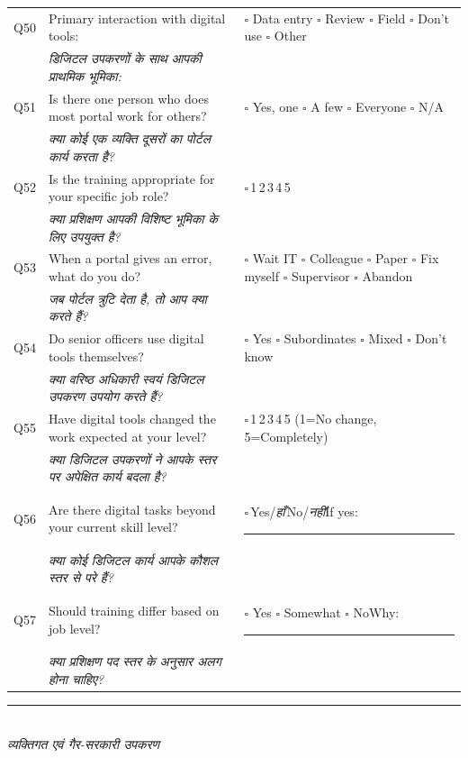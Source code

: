 \documentclass[10pt,a4paper]{article}
\newcommand{\likert}{{\Large$\square$}\,1\quad{\Large$\square$}\,2\quad{\Large$\square$}\,3\quad{\Large$\square$}\,4\quad{\Large$\square$}\,5}
\newcommand{\ymark}{{\Large$\square$}\,Yes/{\hindifont\itshape हाँ}\quad{\Large$\square$}\,No/{\hindifont\itshape नहीं}}
\begin{document}
\noindent\begin{tabularx}{\textwidth}{@{}L{0.8cm} X L{5.2cm}@{}}
Q50 & Primary interaction with digital tools: & {\Large$\square$} Data entry {\Large$\square$} Review {\Large$\square$} Field {\Large$\square$} Don't use {\Large$\square$} Other \\
 & {\hindifont\small\itshape\color{black!70} डिजिटल उपकरणों के साथ आपकी प्राथमिक भूमिका:} & \\[3pt]
Q51 & Is there one person who does most portal work for others? & {\Large$\square$} Yes, one {\Large$\square$} A few {\Large$\square$} Everyone {\Large$\square$} N/A \\
 & {\hindifont\small\itshape\color{black!70} क्या कोई एक व्यक्ति दूसरों का पोर्टल कार्य करता है?} & \\[3pt]
Q52 & Is the training appropriate for your specific job role? & \likert \\
 & {\hindifont\small\itshape\color{black!70} क्या प्रशिक्षण आपकी विशिष्ट भूमिका के लिए उपयुक्त है?} & \\[3pt]
Q53 & When a portal gives an error, what do you do? & {\Large$\square$} Wait IT {\Large$\square$} Colleague {\Large$\square$} Paper {\Large$\square$} Fix myself {\Large$\square$} Supervisor {\Large$\square$} Abandon \\
 & {\hindifont\small\itshape\color{black!70} जब पोर्टल त्रुटि देता है, तो आप क्या करते हैं?} & \\[3pt]
Q54 & Do senior officers use digital tools themselves? & {\Large$\square$} Yes {\Large$\square$} Subordinates {\Large$\square$} Mixed {\Large$\square$} Don't know \\
 & {\hindifont\small\itshape\color{black!70} क्या वरिष्ठ अधिकारी स्वयं डिजिटल उपकरण उपयोग करते हैं?} & \\[3pt]
Q55 & Have digital tools changed the work expected at your level? & \likert{} {\scriptsize(1=No change, 5=Completely)} \\
 & {\hindifont\small\itshape\color{black!70} क्या डिजिटल उपकरणों ने आपके स्तर पर अपेक्षित कार्य बदला है?} & \\[3pt]
Q56 & Are there digital tasks beyond your current skill level? & \ymark\quad If yes: \rule{3cm}{0.4pt} \\
 & {\hindifont\small\itshape\color{black!70} क्या कोई डिजिटल कार्य आपके कौशल स्तर से परे हैं?} & \\[3pt]
Q57 & Should training differ based on job level? & {\Large$\square$} Yes {\Large$\square$} Somewhat {\Large$\square$} No\quad Why: \rule{3cm}{0.4pt} \\
 & {\hindifont\small\itshape\color{black!70} क्या प्रशिक्षण पद स्तर के अनुसार अलग होना चाहिए?} & \\[3pt]
\end{tabularx}
\vspace{3pt}
\noindent\rule{\textwidth}{0.3pt}\vspace{3pt}
\\
{\hindifont\itshape\color{black!70} व्यक्तिगत एवं गैर-सरकारी उपकरण}\vspace{3pt}
\end{document}
